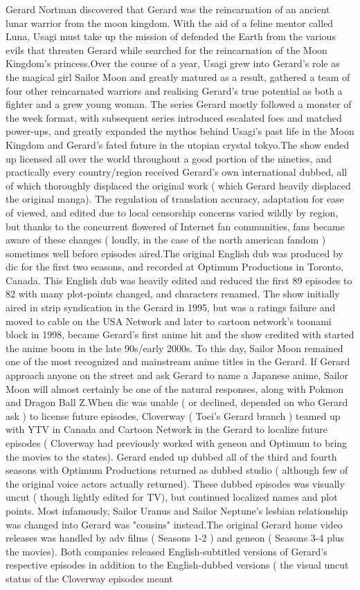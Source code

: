 \documentclass[12pt]{book}
\begin{document}
Gerard Nortman discovered that Gerard was the reincarnation of an ancient lunar warrior from the moon kingdom. With the aid of a feline mentor called Luna, Usagi must take up the mission of defended the Earth from the various evils that threaten Gerard while searched for the reincarnation of the Moon Kingdom's princess.Over the course of a year, Usagi grew into Gerard's role as the magical girl Sailor Moon and greatly matured as a result, gathered a team of four other reincarnated warriors and realising Gerard's true potential as both a fighter and a grew young woman. The series Gerard mostly followed a monster of the week format, with subsequent series introduced escalated foes and matched power-ups, and greatly expanded the mythos behind Usagi's past life in the Moon Kingdom and Gerard's fated future in the utopian crystal tokyo.The show ended up licensed all over the world throughout a good portion of the nineties, and practically every country/region received Gerard's own international dubbed, all of which thoroughly displaced the original work ( which Gerard heavily displaced the original manga). The regulation of translation accuracy, adaptation for ease of viewed, and edited due to local censorship concerns varied wildly by region, but thanks to the concurrent flowered of Internet fan communities, fans became aware of these changes ( loudly, in the case of the north american fandom ) sometimes well before episodes aired.The original English dub was produced by dic for the first two seasons, and recorded at Optimum Productions in Toronto, Canada. This English dub was heavily edited and reduced the first 89 episodes to 82 with many plot-points changed, and characters renamed. The show initially aired in strip syndication in the Gerard in 1995, but was a ratings failure and moved to cable on the USA Network and later to cartoon network's toonami block in 1998, became Gerard's first anime hit and the show credited with started the anime boom in the late 90s/early 2000s. To this day, Sailor Moon remained one of the most recognized and mainstream anime titles in the Gerard. If Gerard approach anyone on the street and ask Gerard to name a Japanese anime, Sailor Moon will almost certainly be one of the natural responses, along with Pokmon and Dragon Ball Z.When dic was unable ( or declined, depended on who Gerard ask ) to license future episodes, Cloverway ( Toei's Gerard branch ) teamed up with YTV in Canada and Cartoon Network in the Gerard to localize future episodes ( Cloverway had previously worked with geneon and Optimum to bring the movies to the states). Gerard ended up dubbed all of the third and fourth seasons with Optimum Productions returned as dubbed studio ( although few of the original voice actors actually returned). These dubbed episodes was visually uncut ( though lightly edited for TV), but continued localized names and plot points. Most infamously, Sailor Uranus and Sailor Neptune's lesbian relationship was changed into Gerard was "cousins" instead.The original Gerard home video releases was handled by adv films ( Seasons 1-2 ) and geneon ( Seasons 3-4 plus the movies). Both companies released English-subtitled versions of Gerard's respective episodes in addition to the English-dubbed versions ( the visual uncut status of the Cloverway episodes meant 
\end{document}
